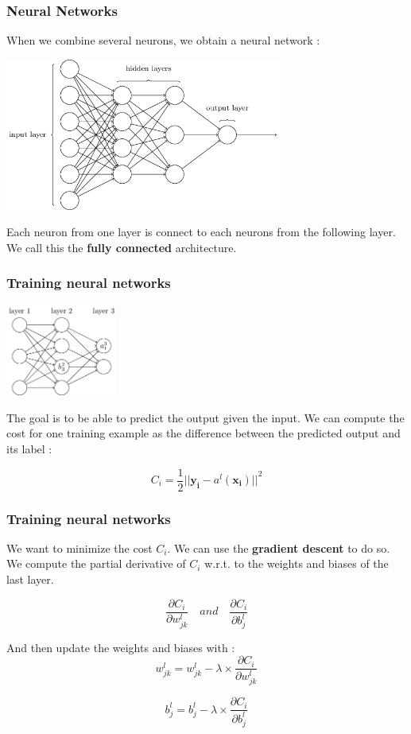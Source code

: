 \documentclass{beamer}
\begin{document}
\begin{frame}
  \frametitle{Neural Networks}
  When we combine several neurons, we obtain a neural network :

  \begin{center}
    \includegraphics[height=5cm]{img/nn.png}
  \end{center}

  Each neuron from one layer is connect to each neurons from the following
  layer. We call this the \textbf{fully connected} architecture.
\end{frame}

\begin{frame}
  \frametitle{Training neural networks}
  \begin{center}
    \includegraphics[height=3cm]{img/backprop_1.png}
  \end{center}
  The goal is to be able to predict the output given the input. We can compute
  the cost for one training example as the difference between the predicted
  output and its label :

  \begin{equation}
    C_i = \frac{1}{2}
    {\lvert \lvert \boldsymbol{y_i} - a^l(\boldsymbol{x_i}) \rvert \rvert}^2
  \end{equation}
\end{frame}

\begin{frame}
  \frametitle{Training neural networks}
  We want to minimize the cost $C_i$. We can use the \textbf{gradient descent}
  to do so. We compute the partial derivative of $C_i$ w.r.t. to the weights and
  biases of the last layer.

  \begin{equation}
    \frac{\partial C_i}{\partial w_{jk}^l} \quad and \quad
    \frac{\partial C_i}{\partial b_j^l}
  \end{equation}

  And then update the weights and biases with :
  \begin{equation}
    w_{jk}^l = w_{jk}^l - \lambda \times\frac{\partial C_i}{\partial w_{jk}^l}
  \end{equation}

  \begin{equation}
    b_j^l = b_j^l - \lambda \times\frac{\partial C_i}{\partial b_j^l}
  \end{equation}
\end{frame}
\end{document}

